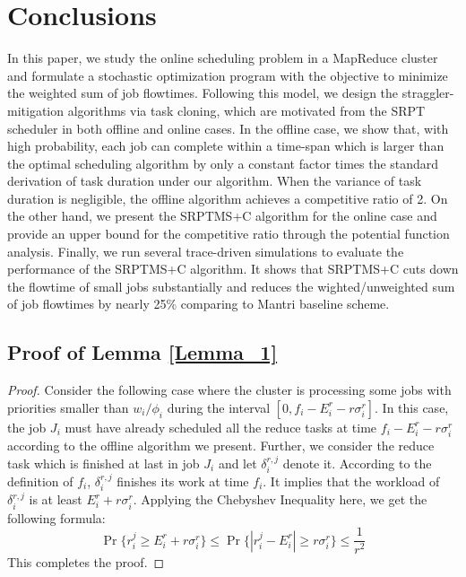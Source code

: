 \documentclass[10pt,conference,compsocconf,letterpaper]{IEEEtran}
\begin{document}
\section{Conclusions}
\label{conclusion}
In this paper, we study the online scheduling problem in a  MapReduce cluster and formulate a stochastic optimization program with the objective to minimize the
weighted sum of job flowtimes. Following this model, we design the straggler-mitigation algorithms via task cloning,  which are motivated from the SRPT scheduler  in
both offline and online cases. In the offline case, we show that, with high probability, each job can complete within a time-span which is 
larger than the optimal scheduling algorithm by only a constant factor times the standard derivation of task duration under our algorithm. 
When the variance of task duration is negligible, the offline algorithm achieves a competitive ratio of 2. On the other hand,
we present the SRPTMS+C algorithm for the online case and provide an upper bound for the competitive ratio through the potential function analysis. Finally, we run several trace-driven simulations to evaluate the performance of the SRPTMS+C algorithm. It shows that SRPTMS+C cuts down the flowtime of small jobs substantially
 and reduces the wighted/unweighted sum of job flowtimes by nearly 25\% comparing to Mantri baseline scheme.







\appendix
\subsection{Proof of Lemma \ref{Lemma_1}}
\label{proof_lemma_1}
\begin{proof}
Consider the following case where the cluster is processing some jobs with priorities smaller than $w_i/\phi_i$ during the interval $[0,f_i-E^r_i - r\sigma^r_i]$. In this case, the job $J_i$ must have already scheduled all the reduce tasks at time $f_i-E^r_i - r\sigma^r_i$ according to the offline algorithm we present. Further, we consider the reduce task which is finished at last in job $J_i$ and let $\delta^{r,j}_i$ denote it. According to the definition of $f_i$, $\delta^{r,j}_i$ finishes its work at time $f_i$. It implies that  the workload of $\delta^{r,j}_i$ is at least $E^r_i + r\sigma^r_i$. Applying the Chebyshev Inequality \cite{probability} here, we get the following formula:
\begin{equation}
\Pr\{r^j_i \geq E^r_i + r\sigma^r_i\} \leq \Pr\{|r^j_i - E^r_i| \geq r\sigma^r_i\} \leq \frac{1}{r^2}
\end{equation}
This completes the proof.
\end{proof}
\end{document}
